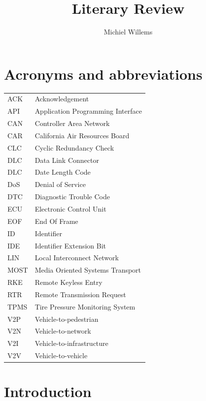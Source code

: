 \documentclass[11pt]{article}
\title{Literary Review}
\author{Michiel Willems}
\begin{document}
	


\section{Acronyms and abbreviations}
\begin{tabular}{ l l }
	ACK & Acknowledgement \\
	API & Application Programming Interface \\
	CAN & Controller Area Network \\
	CAR & California Air Resources Board \\
	CLC & Cyclic Redundancy Check \\
	DLC & Data Link Connector \\
	DLC & Date Length Code \\
	DoS & Denial of Service \\
	DTC & Diagnostic Trouble Code \\
	ECU & Electronic Control Unit \\
	EOF & End Of Frame \\
	ID & Identifier \\
	IDE & Identifier Extension Bit \\
	LIN & Local Interconnect Network \\
	MOST & Media Oriented Systems Transport \\
	RKE & Remote Keyless Entry \\
	RTR & Remote Transmission Request \\
	TPMS & Tire Pressure Monitoring System \\
	V2P & Vehicle-to-pedestrian \\
	V2N & Vehicle-to-network \\
	V2I & Vehicle-to-infrastructure  \\
	V2V & Vehicle-to-vehicle \\
\end{tabular}

\newpage
\tableofcontents

\section{Introduction}
\label{sec:introduction}
\end{document}

